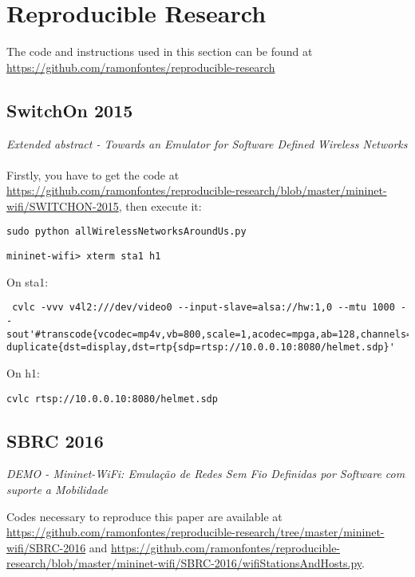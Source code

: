 \chapter{Reproducible Research}

The code and instructions used in this section can be found at \url{https://github.com/ramonfontes/reproducible-research}

\section{SwitchOn 2015}
\textit{Extended abstract - Towards an Emulator for Software Defined Wireless Networks}\\
\textbf{}
\\
Firstly, you have to get the code at \url{https://github.com/ramonfontes/reproducible-research/blob/master/mininet-wifi/SWITCHON-2015}, then execute it:

\begin{verbatim}
sudo python allWirelessNetworksAroundUs.py
\end{verbatim}

\begin{verbatim}
mininet-wifi> xterm sta1 h1
\end{verbatim}

\noindent On sta1:
\begin{verbatim}
 cvlc -vvv v4l2:///dev/video0 --input-slave=alsa://hw:1,0 --mtu 1000 --sout'#transcode{vcodec=mp4v,vb=800,scale=1,acodec=mpga,ab=128,channels=1}: duplicate{dst=display,dst=rtp{sdp=rtsp://10.0.0.10:8080/helmet.sdp}'
\end{verbatim}

\noindent On h1:
\begin{verbatim}
cvlc rtsp://10.0.0.10:8080/helmet.sdp
\end{verbatim}

\section{SBRC 2016}
\textit{DEMO - Mininet-WiFi: Emulação de Redes Sem Fio Definidas por Software com suporte a Mobilidade}

Codes necessary to reproduce this paper are available at \url{https://github.com/ramonfontes/reproducible-research/tree/master/mininet-wifi/SBRC-2016} and \url{https://github.com/ramonfontes/reproducible-research/blob/master/mininet-wifi/SBRC-2016/wifiStationsAndHosts.py}.


